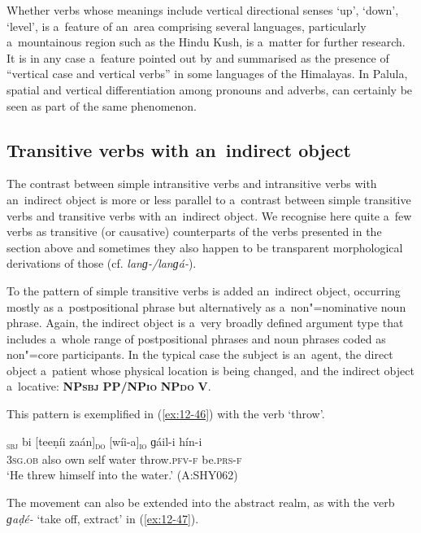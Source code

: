 Whether verbs whose meanings include vertical directional senses `up', `down', `level', is a~feature of an~area comprising several languages, particularly a~mountainous region such as the Hindu Kush, is a~matter for further research. It is in any case a~feature pointed out by \citet[9]{noonan2003} and summarised as the presence of ``vertical case and vertical verbs'' in some languages of the Himalayas. In Palula, spatial and vertical differentiation among pronouns and adverbs, can certainly be seen as part of the same phenomenon. 


\subsection{Transitive verbs with an~indirect object}
\label{subsec:12-2-5}


The contrast between simple intransitive verbs and intransitive verbs with an~indirect object is more or less parallel to a~contrast between simple transitive verbs and transitive verbs with an~indirect object. We recognise here quite a~few verbs as transitive (or causative) counterparts of the verbs presented in the section above and sometimes they also happen to be transparent morphological derivations of those (cf. \textit{lanɡ-/lanɡá-}). 


To the pattern of simple transitive verbs is added an~indirect object, occurring mostly as a~postpositional phrase but alternatively as a~non"=nominative noun phrase. Again, the indirect object is a~very broadly defined argument type that includes a~whole range of postpositional phrases and noun phrases coded as non"=core participants. In the typical case the subject is an~agent, the direct object a~patient whose physical location is being changed, and the indirect object a~locative: \textbf{NP\textsc{sbj}} \textbf{PP/NP\textsc{io}} \textbf{NP\textsc{do}} \textbf{V}. 


This pattern is exemplified in (\ref{ex:12-46}) with the verb `throw'.

\begin{exe}
\ex
\label{ex:12-46}
\gll [tíi]\textsubscript{\textsc{sbj}} bi [teeṇíi zaán]\textsubscript{\textsc{do}} [wíi-a]\textsubscript{\textsc{io}} ɡáil-i hín-i \\
\textsc{3sg.ob} also own self water throw.\textsc{pfv-f} be.\textsc{prs-f} \\
\glt `He threw himself into the water.' (A:SHY062)
\end{exe}

The movement can also be extended into the abstract realm, as with the verb \textit{ɡaḍé-} `take off, extract' in (\ref{ex:12-47}).

